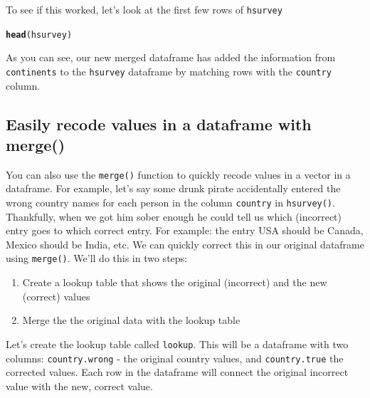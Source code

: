 \documentclass{tufte-book}\usepackage[]{graphicx}\usepackage[]{color}
\makeatletter
\newcommand{\hlstd}[1]{\textcolor[rgb]{0.345,0.345,0.345}{#1}}%
\newcommand{\hlkwd}[1]{\textcolor[rgb]{0.737,0.353,0.396}{\textbf{#1}}}%
\newenvironment{kframe}{%
 \def\at@end@of@kframe{}%
 \ifinner\ifhmode%
  \def\at@end@of@kframe{\end{minipage}}%
  \begin{minipage}{\columnwidth}%
 \fi\fi%
 \def\FrameCommand##1{\hskip\@totalleftmargin \hskip-\fboxsep
 \colorbox{shadecolor}{##1}\hskip-\fboxsep
     \hskip-\linewidth \hskip-\@totalleftmargin \hskip\columnwidth}%
 \MakeFramed {\advance\hsize-\width
   \@totalleftmargin\z@ \linewidth\hsize
   \@setminipage}}%
 {\par\unskip\endMakeFramed%
 \at@end@of@kframe}
\newenvironment{knitrout}{}{} %
\makeatother
\begin{document}
\begin{footnotesize}
To see if this worked, let's look at the first few rows of \texttt{hsurvey}

\begin{footnotesize}
\begin{knitrout}
\color{fgcolor}\begin{kframe}
\begin{alltt}
\hlkwd{head}\hlstd{(hsurvey)}
\end{alltt}


{\ttfamily\noindent\bfseries\color{errorcolor}{\#\# Error in head(hsurvey): object 'hsurvey' not found}}\end{kframe}
\end{knitrout}
\end{footnotesize}

As you can see, our new merged dataframe has added the information from \texttt{continents} to the \texttt{hsurvey} dataframe by matching rows with the \texttt{country} column.

\subsection{Easily recode values in a dataframe with merge()}

You can also use the \texttt{merge()} function to quickly recode values in a vector in a dataframe. For example, let's say some drunk pirate accidentally entered the wrong country names for each person in the column \texttt{country} in \texttt{hsurvey()}. Thankfully, when we got him sober enough he could tell us which (incorrect) entry goes to which correct entry. For example: the entry USA should be Canada, Mexico should be India, etc. We can quickly correct this in our original dataframe using \texttt{merge()}. We'll do this in two steps:

\begin{enumerate}
\item Create a lookup table that shows the original (incorrect) and the new (correct) values
\item Merge the the original data with the lookup table
\end{enumerate}

Let's create the lookup table called \texttt{lookup}. This will be a dataframe with two columns: \texttt{country.wrong} - the original country values, and \texttt{country.true} the corrected values. Each row in the dataframe will connect the original incorrect value with the new, correct value.


\end{footnotesize}
\end{document}
